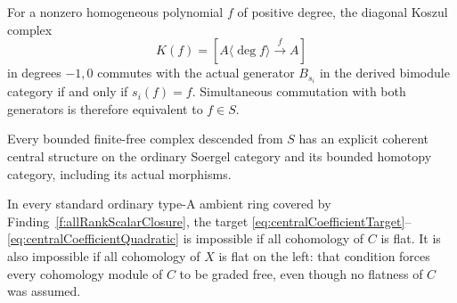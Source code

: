 \begin{finding}
\label{f:centralPolynomialCoefficientGate}
For a nonzero homogeneous polynomial \(f\) of positive
degree, the diagonal Koszul complex
\[
 K(f)=[A\langle\deg f\rangle\xrightarrow{f}A]
\]
in degrees \(-1,0\) commutes with the actual generator
\(B_{s_i}\) in the derived bimodule category if and
only if \(s_i(f)=f\). Simultaneous commutation with
both generators is therefore equivalent to \(f\in S\).

Every bounded finite-free complex descended from \(S\)
has an explicit coherent central structure on the
ordinary Soergel category and its bounded homotopy
category, including its actual morphisms.

In every standard ordinary type-A ambient ring covered
by Finding~\ref{f:allRankScalarClosure}, the target
\eqref{eq:centralCoefficientTarget}--\eqref{eq:centralCoefficientQuadratic}
is impossible if all cohomology of \(C\) is flat.
It is also impossible if all cohomology of \(X\) is
flat on the left: that condition forces every
cohomology module of \(C\) to be graded free, even
though no flatness of \(C\) was assumed.
\end{finding}

